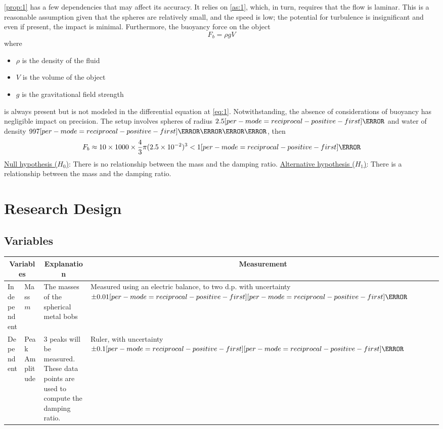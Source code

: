 \documentclass[a4paper,12pt]{article}
\let\oldsi\si
\renewcommand{\si}[1]{\oldsi[per-mode=reciprocal-positive-first]{#1}}
\newcommand{\thcolor}{\cellcolor{Blue!25}}
\begin{document}
\cref{prop:1} has a few dependencies that may affect its accuracy. It relies on \cref{as:1}, which, in turn, requires that the flow is laminar. This is a reasonable assumption given that the spheres are relatively small, and the speed is low; the potential for turbulence is insignificant and even if present, the impact is minimal. Furthermore, the buoyancy force on the object
$$F_b = \rho g V$$ where
\begin{itemize}
  \item $\rho$ is the density of the fluid
  \item $V$ is the volume of the object
  \item $g$ is the gravitational field strength
\end{itemize}
is always present but is not modeled in the differential equation at \cref{eq:1}. Notwithstanding, the absence of considerations of buoyancy has negligible impact on precision. The setup involves spheres of radius $2.5\si{\cm}$ and water of density $997\si{\kg\per\m\cubed}$, then
$$F_b \approx 10 \times 1000 \times \frac{4}{3}\pi (2.5\times 10^{-2})^3 < 1\si{\N}$$
\underline{Null hypothesis ($H_0$)}: There is no relationship between the mass and the damping ratio.
\underline{Alternative hypothesis ($H_1$)}: There is a relationship between the mass and the damping ratio.
\pagebreak

\section{Research Design}

\subsection{Variables}

\begin{center}
  \begin{tabular}{|p{}|p{}|p{}|p{}|}
    \hline
    \multicolumn{2}{|c}{\thcolor Variables} & \multicolumn{1}{|c}{\thcolor Explanation} & \multicolumn{1}{|c|}{\thcolor Measurement}                                                                                                                                \\  \hline
    Independent                             & Mass $m$                                  & The masses of the spherical metal bobs                                              & Measured using an electric balance, to two d.p. with uncertainty $\pm 0.01 \si{\g}$ \\
    \hline
    Dependent                               & Peak Amplitude                            & 3 peaks will  be measured. These data points are used to compute the damping ratio. & Ruler, with uncertainty $\pm 0.1\si{\cm}$                                           \\
    \hline
  \end{tabular}
  \label{tab:1}
\end{center}
\end{document}
